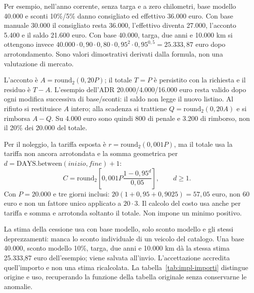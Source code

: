 Per esempio, nell'anno corrente, senza targa e a zero chilometri, base
modello 40.000 e sconti 10\%/5\% danno consigliato ed effettivo 36.000 euro.
Con base manuale 30.000 il consigliato resta 36.000, l'effettivo diventa
27.000, l'acconto 5.400 e il saldo 21.600 euro. Con base 40.000, targa,
due anni e 10.000 km si ottengono invece
$40.000\cdot0{,}90\cdot0{,}80\cdot0{,}95^2\cdot0{,}95^{0{,}5}
=25.333{,}87$ euro dopo arrotondamento. Sono valori dimostrativi derivati
dalla formula, non una valutazione di mercato.

L'acconto è $A=\mathrm{round}_2(0{,}20P)$; il totale $T=P$ è
persistito con la richiesta e il residuo è $T-A$. L'esempio dell'ADR
20.000/4.000/16.000 euro resta valido dopo ogni modifica successiva di
base/sconti: il saldo non legge il nuovo listino. Al rifiuto si restituisce
$A$ intero; alla scadenza si trattiene
$Q=\mathrm{round}_2(0{,}20A)$ e si rimborsa $A-Q$.
Su 4.000 euro sono quindi 800 di penale e 3.200 di rimborso, non il 20\%
dei 20.000 del totale.

Per il noleggio, la tariffa esposta è
$r=\mathrm{round}_2(0{,}001P)$, ma il totale usa la tariffa non
ancora arrotondata e la somma geometrica per
$d=\mathrm{DAYS.between}(inizio,fine)+1$:
\[
 C=\mathrm{round}_2\!\left[0{,}001P
       \frac{1-0{,}95^d}{0{,}05}\right],\qquad d\geq1.
\]
Con $P=20.000$ e tre giorni inclusi: $20(1+0{,}95+0{,}9025)=57{,}05$
euro, non 60 euro e non un fattore unico applicato a $20\cdot3$.
Il calcolo del costo usa  anche per tariffa e somma e
arrotonda soltanto il totale. Non impone un minimo positivo.

La stima della cessione usa  con base modello,
solo sconto modello e gli stessi deprezzamenti: manca lo sconto individuale
di un veicolo del catalogo. Una base 40.000, sconto modello 10\%, targa,
due anni e 10.000 km dà la stessa stima 25.333,87 euro dell'esempio; viene
salvata all'invio. L'accettazione accredita quell'importo e non una stima
ricalcolata. La tabella~\ref{tab:impl-importi} distingue origine e uso,
recuperando la funzione della tabella originale senza conservarne le anomalie.

